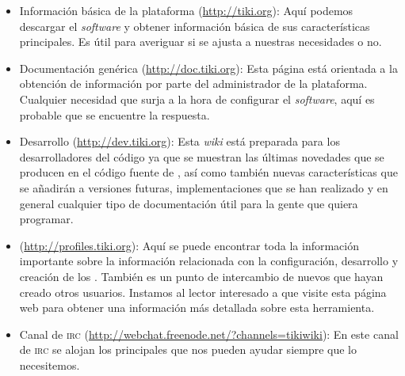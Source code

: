 \begin{itemize}
\item Información básica de la plataforma (\url{http://tiki.org}): Aquí podemos descargar el \textit{software} y obtener información básica de sus características principales. Es útil para averiguar si \tiki{} se ajusta a nuestras necesidades o no.

 \item Documentación genérica (\url{http://doc.tiki.org}): Esta página está orientada a la obtención de información por parte del administrador de la plataforma. Cualquier necesidad que surja a la hora de configurar el \textit{software}, aquí es probable que se encuentre la respuesta.
 
 \item Desarrollo (\url{http://dev.tiki.org}): Esta \textit{wiki} está preparada para los desarrolladores del código ya que se muestran las últimas novedades que se producen en el código fuente de \tiki{}, así como también nuevas características que se añadirán a versiones futuras, implementaciones que se han realizado y en general cualquier tipo de documentación útil para la gente que quiera programar.

 \item \profiles{} (\url{http://profiles.tiki.org}): Aquí se puede encontrar toda la información importante sobre la información relacionada con la configuración, desarrollo y creación de los \profiles{}. También es un punto de intercambio de nuevos \profiles{} que hayan creado otros usuarios. Instamos al lector interesado a que visite esta página web para obtener una información más detallada sobre esta herramienta.

 \item Canal de \textsc{irc} (\url{http://webchat.freenode.net/?channels=tikiwiki}): En este canal de \textsc{irc} se alojan los principales  que nos pueden ayudar siempre que lo necesitemos.
\end{itemize}
